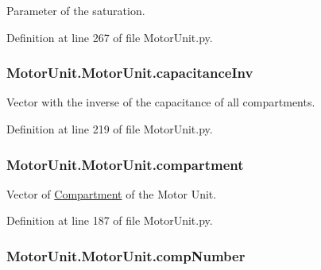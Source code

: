 Parameter of the saturation. 



Definition at line 267 of file Motor\+Unit.\+py.

\subsubsection[{\texorpdfstring{capacitance\+Inv}{capacitanceInv}}]{\setlength{\rightskip}{0pt plus 5cm}Motor\+Unit.\+Motor\+Unit.\+capacitance\+Inv}\hypertarget{class_motor_unit_1_1_motor_unit_a0cf2afb5bd12374db56b9d9a5a1671e6}{}\label{class_motor_unit_1_1_motor_unit_a0cf2afb5bd12374db56b9d9a5a1671e6}


Vector with the inverse of the capacitance of all compartments. 



Definition at line 219 of file Motor\+Unit.\+py.

\subsubsection[{\texorpdfstring{compartment}{compartment}}]{\setlength{\rightskip}{0pt plus 5cm}Motor\+Unit.\+Motor\+Unit.\+compartment}\hypertarget{class_motor_unit_1_1_motor_unit_a6d4da7327031b3cb9c7041a4a790e524}{}\label{class_motor_unit_1_1_motor_unit_a6d4da7327031b3cb9c7041a4a790e524}


Vector of \hyperlink{namespace_compartment}{Compartment} of the Motor Unit. 



Definition at line 187 of file Motor\+Unit.\+py.

\subsubsection[{\texorpdfstring{comp\+Number}{compNumber}}]{\setlength{\rightskip}{0pt plus 5cm}Motor\+Unit.\+Motor\+Unit.\+comp\+Number}\hypertarget{class_motor_unit_1_1_motor_unit_afe7281fb12c41102980b6b48d5a49713}{}\label{class_motor_unit_1_1_motor_unit_afe7281fb12c41102980b6b48d5a49713}


